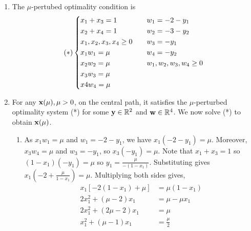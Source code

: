 \begin{enumerate}
\begin{enumerate}[label=(\alph*)]
              \item The \(\mu\)-pertubed optimality condition is
                    \[(*) \begin{cases*}
                            x_1 + x_3 = 1  \quad             & \(w_1 = - 2 - y_1 \)          \\
                            x_2 + x_4  = 1  \quad            & \(w_2 = -3 - y_2\)            \\
                            x_1, x_2, x_3, x_4 \geq 0  \quad & \(w_3 = -y_1\)                \\
                            x_1w_1 = \mu    \quad            & \(w_4 = -y_2\)                \\
                            x_2w_2 = \mu  \quad              & \(w_1, w_2, w_3, w_4 \geq 0\) \\
                            x_3w_3 = \mu                                                     \\
                            x4 w_4 = \mu
                        \end{cases*}\]
              \item For any \(\mathbf{x}(\mu), \mu > 0\), on the central path, it satisfies the \(\mu\)-perturbed optimality system (*) for some \(\mathbf{y} \in \mathbb{R}^2\) and \(\mathbf{w} \in \mathbb{R}^4\). We now solve (*) to obtain \(\mathbf{x}(\mu)\).
                    \begin{enumerate}[label=(\arabic*)]
                        \item As \(x_1w_1 = \mu\) and \(w_1 = -2 - y_1\), we have \(x_1(-2-y_1) = \mu\). Moreover, \(x_3w_4 = \mu\) and \(w_3 = -y_1\), so \(x_3(-y_1) = \mu\). Note that \(x_1 + x_3 = 1\) so \((1 - x_1)(-y_1) = \mu\) so \(y_1 = \frac{\mu}{-(1 - x_1)}\). Substituting gives \(x_1(-2 + \frac{\mu}{1 - x_1}) = \mu\). Multiplying both sides gives,
                              \begin{align*}
                                  x_1[-2(1 - x_1) + \mu]                 & = \mu(1 - x_1)                                                         \\
                                  2x_1^2 + (\mu - 2)x_1                  & = \mu - \mu x_1                                                        \\
                                  2x_1^2 + (2\mu - 2)x_1                 & = \mu                                                                  \\
                                  x_1^2 + (\mu - 1)x_1                   & = \frac{\mu}{2}                                                        \\

\end{align*}
\end{enumerate}
\end{enumerate}
\end{enumerate}
